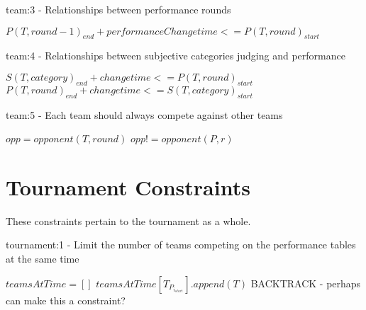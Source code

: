 \documentclass[letterpaper,11pt]{report}
\begin{document}
\begin{algorithm}
\caption{team:3 - Relationships between performance rounds}
\begin{algorithmic}
  \STATE $P(T, round-1)_{end} + performanceChangetime <= P(T, round)_{start}$
\ENDFOR
\end{algorithmic}
\end{algorithm}


\FloatBarrier
\begin{algorithm}
\caption{team:4 - Relationships between subjective categories judging and performance}
\begin{algorithmic}
      \STATE $S(T, category)_{end} + changetime <= P(T, round)_{start}$
    \ELSE
      \STATE $P(T, round)_{end} + changetime <= S(T, category)_{start}$
    \ENDIF
  \ENDFOR
\ENDFOR
\end{algorithmic}
\end{algorithm}

\begin{algorithm}
\caption{team:5 - Each team should always compete against other teams}
\begin{algorithmic}
  \STATE $opp = opponent(T, round)$
    \STATE $opp != opponent(P, r)$
  \ENDFOR
\ENDFOR
\end{algorithmic}
\end{algorithm}


\FloatBarrier
\section{Tournament Constraints}
These constraints pertain to the tournament as a whole.

\begin{algorithm}
\caption{tournament:1 - Limit the number of teams competing on the performance tables at
  the same time}
\begin{algorithmic}

\STATE $teamsAtTime = []$
    \STATE $teamsAtTime[T_{P_{i_{start}}}].append(T)$
  \ENDFOR
      \STATE BACKTRACK - perhaps can make this a constraint?
    \ENDIF
  \ENDFOR
\ENDFOR

\end{algorithmic}
\end{algorithm}
\end{document}
